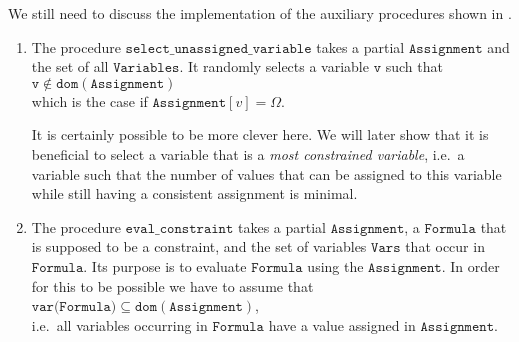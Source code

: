 We still need to discuss the implementation of the auxiliary procedures shown in . 
\begin{enumerate}
\item The procedure $\mathtt{select\_unassigned\_variable}$ takes a partial $\mathtt{Assignment}$ and the set
      of all $\mathtt{Variables}$.  It randomly selects a variable $\mathtt{v}$ such that 
      \\[0.2cm]
      \hspace*{1.3cm}
      $\mathtt{v} \not\in \mathtt{dom}(\mathtt{Assignment})$
      \\[0.2cm]
      which is the case if $\mathtt{Assignment}[v] = \Omega$.

      It is certainly possible to be more clever here.  We will later show that it is beneficial to select a
      variable that is a \emph{\color{blue}most constrained variable}, i.e.~a variable such that the number of
      values that can be assigned to this variable while still having a consistent assignment is minimal.
\item The procedure $\mathtt{eval\_constraint}$ takes a partial $\mathtt{Assignment}$, a $\mathtt{Formula}$
      that is supposed to be a constraint, and the set of variables $\mathtt{Vars}$ that occur in
      $\mathtt{Formula}$.  Its purpose is to evaluate $\mathtt{Formula}$ using the $\mathtt{Assignment}$.  In
      order for this to be possible we have to assume that
      \\[0.2cm]
      \hspace*{1.3cm}
      $\mathtt{var}(\mathtt{Formula)} \subseteq \mathtt{dom}(\mathtt{Assignment})$,
      \\[0.2cm]
      i.e.~all variables occurring in $\mathtt{Formula}$ have a value assigned in $\mathtt{Assignment}$.


\end{enumerate}
